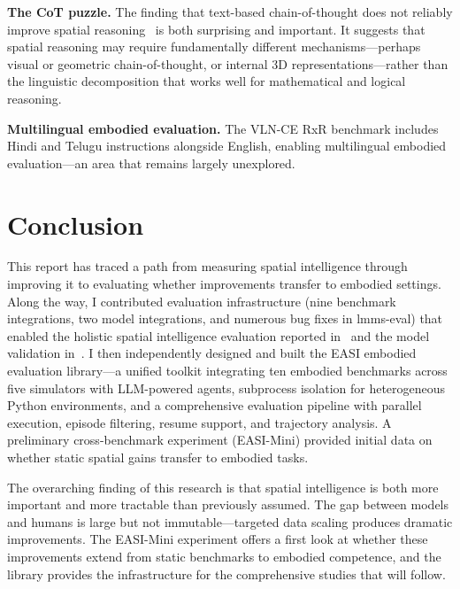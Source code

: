 \documentclass[
hf,
]{confart}
\begin{document}
\textbf{The CoT puzzle.} The finding that text-based chain-of-thought does not reliably improve spatial reasoning~\cite{cai2025scalingspatialintelligencemultimodal} is both surprising and important. It suggests that spatial reasoning may require fundamentally different mechanisms---perhaps visual or geometric chain-of-thought, or internal 3D representations---rather than the linguistic decomposition that works well for mathematical and logical reasoning.

\textbf{Multilingual embodied evaluation.} The VLN-CE RxR benchmark includes Hindi and Telugu instructions alongside English, enabling multilingual embodied evaluation---an area that remains largely unexplored.


\section{Conclusion}
\label{sec:conclusion}

This report has traced a path from measuring spatial intelligence through improving it to evaluating whether improvements transfer to embodied settings. Along the way, I contributed evaluation infrastructure (nine benchmark integrations, two model integrations, and numerous bug fixes in lmms-eval) that enabled the holistic spatial intelligence evaluation reported in~\cite{cai2025holisticevaluationmultimodalllms} and the model validation in~\cite{cai2025scalingspatialintelligencemultimodal}. I then independently designed and built the EASI embodied evaluation library---a unified toolkit integrating ten embodied benchmarks across five simulators with LLM-powered agents, subprocess isolation for heterogeneous Python environments, and a comprehensive evaluation pipeline with parallel execution, episode filtering, resume support, and trajectory analysis. A preliminary cross-benchmark experiment (EASI-Mini) provided initial data on whether static spatial gains transfer to embodied tasks.

The overarching finding of this research is that spatial intelligence is both more important and more tractable than previously assumed. The gap between models and humans is large but not immutable---targeted data scaling produces dramatic improvements. The EASI-Mini experiment offers a first look at whether these improvements extend from static benchmarks to embodied competence, and the library provides the infrastructure for the comprehensive studies that will follow.
\end{document}
